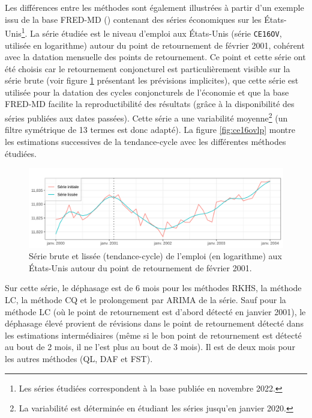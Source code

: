 \documentclass[
  12pt,
  a4paper,french]{article}
\newcommand\1{\mathds{1}}
\begin{document}
Les différences entre les méthodes sont également illustrées à partir d'un exemple issu de la base FRED-MD (\textcite{fredmd}) contenant des séries économiques sur les États-Unis\footnote{
  Les séries étudiées correspondent à la base publiée en novembre 2022.}.
La série étudiée est le niveau d'emploi aux États-Unis (série \texttt{CE16OV}, utilisée en logarithme) autour du point de retournement de février 2001, cohérent avec la datation mensuelle des points de retournement.
Ce point et cette série ont été choisis car le retournement conjoncturel est particulièrement visible sur la série brute (voir figure \ref{fig:ce16ov} présentant les prévisions implicites), que cette série est utilisée pour la datation des cycles conjoncturels de l'économie et que la base FRED-MD facilite la reproductibilité des résultats (grâce à la disponibilité des séries publiées aux dates passées).
Cette série a une variabilité moyenne\footnote{
  La variabilité est déterminée en étudiant les séries jusqu'en janvier 2020.} (un filtre symétrique de 13 termes est donc adapté).
La figure \ref{fig:ce16ovlp} montre les estimations successives de la tendance-cycle avec les différentes méthodes étudiées.

\begin{figure}

{\centering \includegraphics[width=0.95\linewidth]{img/nber/ce16ov} 

}

\caption[Série brute et lissée (tendance-cycle) de l'emploi (en logarithme) aux États-Unis autour du point de retournement de février 2001]{Série brute et lissée (tendance-cycle) de l'emploi (en logarithme) aux États-Unis autour du point de retournement de février 2001.}\label{fig:ce16ov}

\footnotesize
\normalsize\end{figure}

Sur cette série, le déphasage est de 6 mois pour les méthodes RKHS, la méthode LC, la méthode CQ et le prolongement par ARIMA de la série.
Sauf pour la méthode LC (où le point de retournement est d'abord détecté en janvier 2001), le déphasage élevé provient de révisions dans le point de retournement détecté dans les estimations intermédiaires (même si le bon point de retournement est détecté au bout de 2 mois, il ne l'est plus au bout de 3 mois).
Il est de deux mois pour les autres méthodes (QL, DAF et FST).
\end{document}
